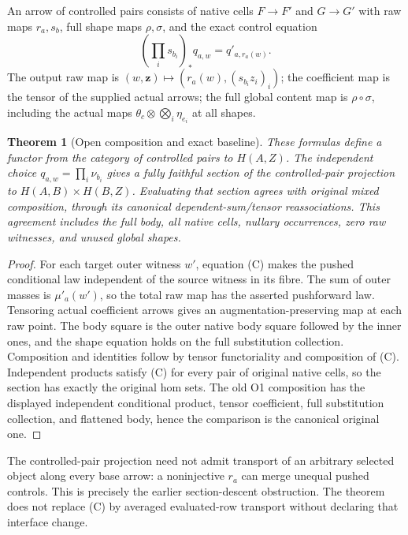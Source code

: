 \documentclass[11pt]{article}
\newtheorem{theorem}{Theorem}\newtheorem{proposition}[theorem]{Proposition}
\begin{document}
An arrow of controlled pairs consists of native cells $F\to F'$ and $G\to G'$ with raw maps $r_a,s_b$, full shape maps $\rho,\sigma$, and the exact control equation
\[
 (\prod_i s_{b_i})_*q_{a,w}=q'_{a,r_a(w)}.\tag{C}
\]
The output raw map is $(w,\mathbf z)\mapsto(r_a(w),(s_{b_i}z_i)_i)$; the coefficient map is the tensor of the supplied actual arrows; the full global content map is $\rho\circ\sigma$, including the actual maps $\theta_c\otimes\bigotimes_i\eta_{e_i}$ at all shapes.

\begin{theorem}[Open composition and exact baseline]
These formulas define a functor from the category of controlled pairs to $H(A,Z)$. The independent choice $q_{a,w}=\prod_i\nu_{b_i}$ gives a fully faithful section of the controlled-pair projection to $H(A,B)\times H(B,Z)$. Evaluating that section agrees with original mixed composition, through its canonical dependent-sum/tensor reassociations. This agreement includes the full body, all native cells, nullary occurrences, zero raw witnesses, and unused global shapes.
\end{theorem}
\begin{proof}
For each target outer witness $w'$, equation (C) makes the pushed conditional law independent of the source witness in its fibre. The sum of outer masses is $\mu'_a(w')$, so the total raw map has the asserted pushforward law. Tensoring actual coefficient arrows gives an augmentation-preserving map at each raw point. The body square is the outer native body square followed by the inner ones, and the shape equation holds on the full substitution collection. Composition and identities follow by tensor functoriality and composition of (C). Independent products satisfy (C) for every pair of original native cells, so the section has exactly the original hom sets. The old O1 composition has the displayed independent conditional product, tensor coefficient, full substitution collection, and flattened body, hence the comparison is the canonical original one.\end{proof}

The controlled-pair projection need not admit transport of an arbitrary selected object along every base arrow: a noninjective $r_a$ can merge unequal pushed controls. This is precisely the earlier section-descent obstruction. The theorem does not replace (C) by averaged evaluated-row transport without declaring that interface change.
\end{document}
